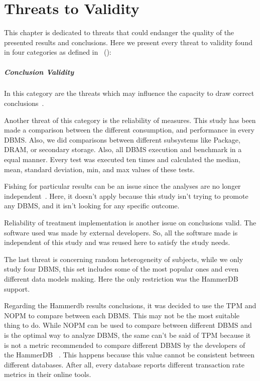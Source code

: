 \chapter{Threats to Validity}
\label{cha:Threats}

This chapter is dedicated to threats that could endanger the quality of the presented results and conclusions. Here we present every threat to validity found in four categories as defined in \citeauthor{cook1979quasi}~(\citeyear{cook1979quasi}): 

\paragraph{Conclusion Validity}
In this category are the threats which may influence the capacity to draw correct conclusions~\cite{10.5555/2349018}.
    
Another threat of this category is the reliability of measures. This study has been made a comparison between the different consumption, and performance in every DBMS.  Also, we did comparisons between different subsystems like Package, DRAM, or secondary storage. Also, all DBMS execution and benchmark in a equal manner.  Every test was executed ten times and calculated the median, mean, standard deviation, min, and max values of these tests.


Fishing for particular results can be an issue since the analyses are no longer independent~\cite{10.5555/2349018}. Here, it doesn't apply because this study isn't trying to promote any DBMS, and it isn't looking for any specific outcome.


Reliability of treatment implementation is another issue on conclusions valid. The software used was made by external developers. So, all the software made is independent of this study and was reused here to satisfy the study needs.


The last threat is concerning random heterogeneity of subjects, while we only study four DBMS, this set includes some of the most popular ones and even different data models making. Here the only restriction was the HammerDB support.

Regarding the Hammerdb results conclusions, it was decided to use the TPM and NOPM to compare between each DBMS. This may not be the most suitable thing to do. While NOPM can be used to compare between different DBMS and is the optimal way to analyze DBMS, the same can't be said of TPM because it is not a metric recommended to compare different DBMS by the developers of the HammerDB ~\cite{hammerdb}. This happens because this value cannot be consistent between different databases. After all, every database reports different transaction rate metrics in their online tools.







